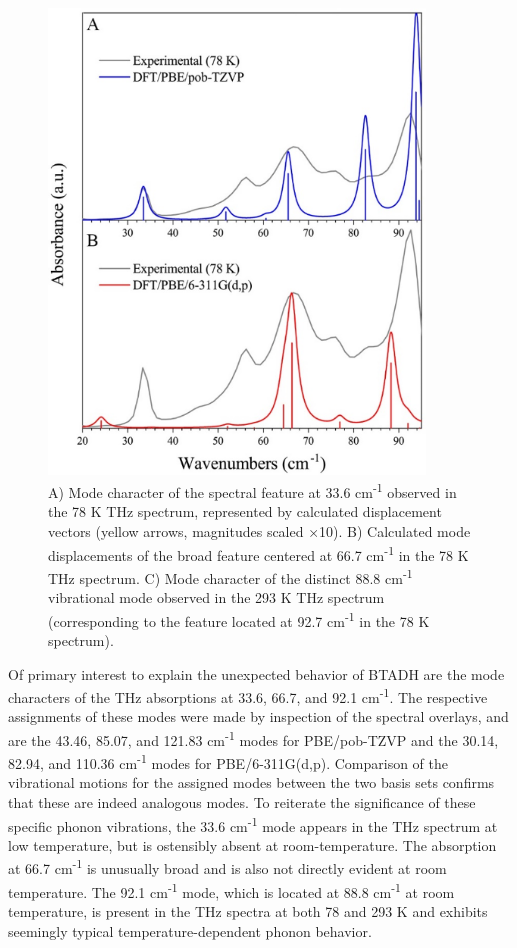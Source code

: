 \begin{figure}[h!]
  \center
  \includegraphics[width=10cm]{src/figures/btadh_figs/btadh_fig5.png}
  \caption{A) Mode character of the spectral feature at 33.6 cm\textsuperscript{-1} observed in the 78 K THz spectrum, represented by calculated displacement vectors (yellow arrows, magnitudes scaled ×10). B) Calculated mode displacements of the broad feature centered at 66.7 cm\textsuperscript{-1} in the 78 K THz spectrum. C) Mode character of the distinct 88.8 cm\textsuperscript{-1} vibrational mode observed in the 293 K THz spectrum (corresponding to the feature located at 92.7 cm\textsuperscript{-1} in the 78 K spectrum).}
  \label{btadh_thz2}
\end{figure}
\newpage
Of primary interest to explain the unexpected behavior of BTADH are the mode characters of the THz absorptions at 33.6, 66.7, and 92.1 cm\textsuperscript{-1}. The respective assignments of these modes were made by inspection of the spectral overlays, and are the 43.46, 85.07, and 121.83 cm\textsuperscript{-1} modes for PBE/pob-TZVP and the 30.14, 82.94, and 110.36 cm\textsuperscript{-1} modes for PBE/6-311G(d,p). Comparison of the vibrational motions for the assigned modes between the two basis sets confirms that these are indeed analogous modes. To reiterate the significance of these specific phonon vibrations, the 33.6 cm\textsuperscript{-1} mode appears in the THz spectrum at low temperature, but is ostensibly absent at room-temperature. The absorption at 66.7 cm\textsuperscript{-1} is unusually broad and is also not directly evident at room temperature. The 92.1 cm\textsuperscript{-1} mode, which is located at 88.8 cm\textsuperscript{-1} at room temperature, is present in the THz spectra at both 78 and 293 K and exhibits seemingly typical temperature-dependent phonon behavior. 
